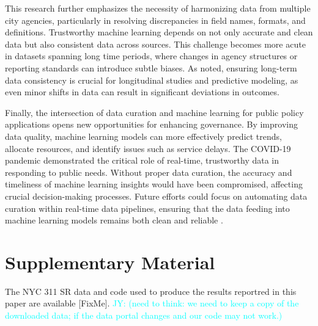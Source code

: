 \documentclass[linenumber]{jdsart}
\newcommand{\jy}[1]{\textcolor{cyan}{JY: (#1)}}
\begin{document}
This research further emphasizes the necessity of harmonizing data
from multiple city agencies, particularly in resolving discrepancies
in field names, formats, and definitions. Trustworthy machine learning
depends on not only accurate and clean data but also consistent data
across sources. This challenge becomes more acute in datasets spanning
long time periods, where changes in agency structures or reporting
standards can introduce subtle biases. As \citet{rahm2000data} noted,
ensuring long-term data consistency is crucial for longitudinal
studies and predictive modeling, as even minor shifts in data can
result in significant deviations in outcomes.


Finally, the intersection of data curation and machine learning for
public policy applications opens new opportunities for enhancing
governance. By improving data quality, machine learning models can
more effectively predict trends, allocate resources, and identify
issues such as service delays. The COVID-19 pandemic demonstrated the
critical role of real-time, trustworthy data in responding to public
needs. Without proper data curation, the accuracy and timeliness of
machine learning insights would have been compromised, affecting
crucial decision-making processes. Future efforts could focus on
automating data curation within real-time data pipelines, ensuring
that the data feeding into machine learning models remains both clean
and reliable \citep{chu2016data}.

\section*{Supplementary Material}
The NYC 311 SR data and code used to produce the results reportred in
this paper are available [FixMe].
\jy{need to think: we need to keep a copy of the downloaded data;
  if the data portal changes and our code may not work.}





\end{document}
